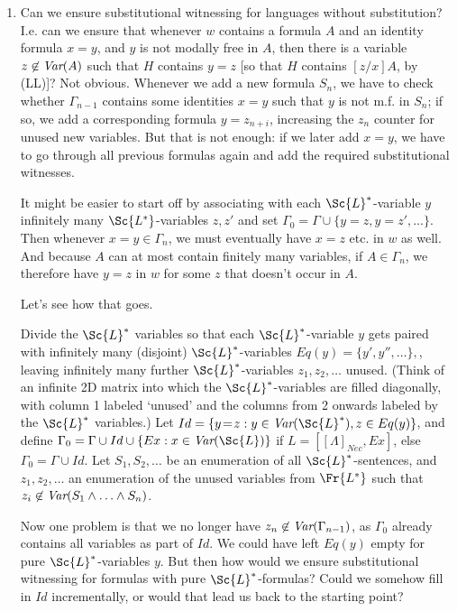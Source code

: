 \documentclass[11pt]{woarticle}
\theoremstyle{break}
\theoremstyle{nonumberplain}
\newcommand{\1}{\;\,|\;\,}
\newcommand{\var}{\emph{Var}}
\begin{document}
{\begin{enumerate}
  \item Can we ensure substitutional witnessing for languages without
    substitution? I.e. can we ensure that whenever $w$ contains a
    formula $A$ and an identity formula $x\!=\!y$, and $y$ is not
    modally free in $A$, then there is a variable $z \not\in \var(A)$
    such that $H$ contains $y\!=\!z$ [so that $H$ contains $[z/x]A$,
    by (LL)]? Not obvious. Whenever we add a new formula $S_n$, we
    have to check whether $\Gamma_{n-1}$ contains some identities
    $x\!=\!y$ such that $y$ is not m.f. in $S_n$; if so, we add a
    corresponding formula $y\!=\!z_{n+i}$, increasing the $z_n$
    counter for unused new variables. But that is not enough: if we
    later add $x\!=\!y$, we have to go through all previous formulas
    again and add the required substitutional witnesses.

    It might be easier to start off by associating with each
    $\Sc{L}^*$-variable $y$ infinitely many $\Sc{L^*}$-variables
    $z,z'$ and set $\Gamma_0 = \Gamma \cup \{ y\!=\!z, y\!=\!z',
    \ldots \}$. Then whenever $x\!=\!y \in \Gamma_n$, we must
    eventually have $x\!=\!z$ etc. in $w$ as well. And because $A$
    can at most contain finitely many variables, if $A \in \Gamma_n$,
    we therefore have $y\!=\!z$ in $w$ for some $z$ that doesn't occur
    in $A$.

    Let's see how that goes.

    Divide the $\Sc{L}^*$ variables so that each $\Sc{L}^*$-variable
    $y$ gets paired with infinitely many (disjoint)
    $\Sc{L}^*$-variables $Eq(y) = \{ y',y'',\ldots \},$, leaving
    infinitely many further $\Sc{L}^*$-variables $z_1,z_2,\ldots$
    unused. (Think of an infinite 2D matrix into which the
    $\Sc{L}^*$-variables are filled diagonally, with column 1 labeled
    `unused' and the columns from 2 onwards labeled by the $\Sc{L}^*$
    variables.) Let $Id = \{ y\!=\!z : y \in \var(\Sc{L}^*), z \in
    Eq(y) \}$, and define $\Gamma_0 = \Gamma \cup Id \cup \{ Ex : x
    \in \var(\Sc{L}) \}$ if $L = [[\Lambda]_{Nec}, Ex]$, else $\Gamma_0
    = \Gamma \cup Id$. Let $S_1,S_2,\ldots$ be an enumeration of all
    $\Sc{L}^*$-sentences, and $z_1,z_2,\ldots$ an enumeration of the
    unused variables from $\Fr{L^*}$ such that $z_i \not\in
    \var(S_1\land\ldots\land S_n)$.

    Now one problem is that we no longer have $z_n \not\in
    \var(\Gamma_{n-1})$, as $\Gamma_0$ already contains all variables
    as part of $Id$. We could have left $Eq(y)$ empty for pure
    $\Sc{L}^*$-variables $y$. But then how would we ensure
    substitutional witnessing for formulas with pure
    $\Sc{L}^*$-formulas? Could we somehow fill in $Id$ incrementally,
    or would that lead us back to the starting point?

  \end{enumerate}

}
\end{document}

